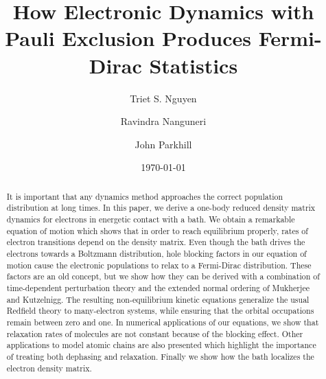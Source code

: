 \documentclass[aip,jcp,preprint,floatfix]{revtex4-1}
\begin{document}
\title{How Electronic Dynamics with Pauli Exclusion Produces Fermi-Dirac Statistics}


\author{Triet S. Nguyen}
\author{Ravindra Nanguneri}
 {
\author{John Parkhill}

\date{\today}

\begin{abstract}
    It is important that any dynamics method approaches the correct population distribution at long times. In this paper, we derive a one-body reduced density matrix dynamics for electrons in energetic contact with a bath. We obtain a remarkable equation of motion which shows that in order to reach equilibrium properly, rates of electron transitions depend on the density matrix. Even though the bath drives the electrons towards a Boltzmann distribution, hole blocking factors in our equation of motion cause the electronic populations to relax to a Fermi-Dirac distribution. These factors are an old concept, but we show how they can be derived with a combination of time-dependent perturbation theory and the extended normal ordering of Mukherjee and Kutzelnigg. The resulting non-equilibrium kinetic equations generalize the usual Redfield theory to many-electron systems, while ensuring that the orbital occupations remain between zero and one. In numerical applications of our equations, we show that relaxation rates of molecules are not constant because of the blocking effect. Other applications to model atomic chains are also presented which highlight the importance of treating both dephasing and relaxation. Finally we show how the bath localizes the electron density matrix.\end{abstract}

\maketitle

}
\end{document}
